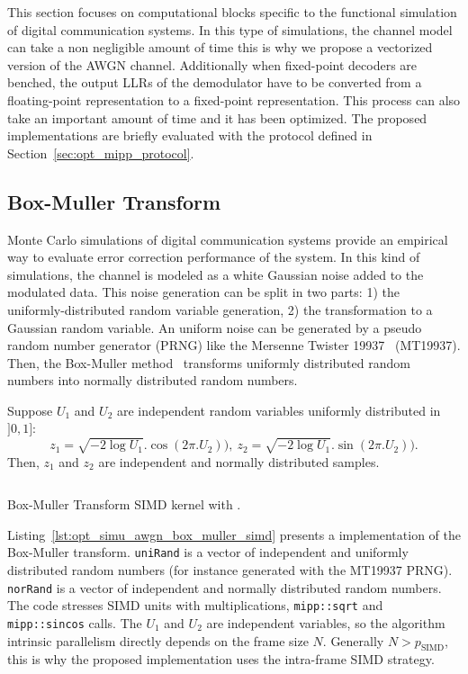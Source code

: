 This section focuses on computational blocks specific to the functional
simulation of digital communication systems. In this type of simulations,
the channel model can take a non negligible amount of time this is why we
propose a vectorized version of the AWGN channel. Additionally when fixed-point
decoders are benched, the output LLRs of the demodulator have to be converted
from a floating-point representation to a fixed-point representation. This
process can also take an important amount of time and it has been optimized.
The proposed implementations are briefly evaluated with the protocol defined in
Section~\ref{sec:opt_mipp_protocol}.

\subsection{Box-Muller Transform}
\label{sec:opt_simu_awgn}

Monte Carlo simulations of digital communication systems provide an empirical
way to evaluate error correction performance of the system. In this kind of
simulations, the channel is modeled as a white Gaussian noise added to the
modulated data. This noise generation can be split in two parts: 1) the
uniformly-distributed random variable generation, 2) the transformation to a
Gaussian random variable. An uniform noise can be generated by a pseudo random
number generator (PRNG) like the Mersenne Twister 19937~\cite{Matsumoto1998}
(MT19937). Then, the Box-Muller method~\cite{Box1958} transforms uniformly
distributed random numbers into normally distributed random numbers.

Suppose $U_1$ and $U_2$ are independent random variables uniformly distributed
in $]0, 1]$:
\begin{equation*}
  z_1 = \sqrt{-2 \log{U_1}}.\cos(2\pi.U_2)),~z_2 = \sqrt{-2 \log{U_1}}.\sin(2\pi.U_2)).
\end{equation*}
Then, $z_1$ and $z_2$ are independent and normally distributed samples.

\begin{listing}[htp]
  \inputminted[frame=lines,linenos]{C++}{\curChapter/src/simu/awgn/box_muller_simd.cpp}
  \caption{Box-Muller Transform SIMD kernel with \MIPP.}
  \label{lst:opt_simu_awgn_box_muller_simd}
\end{listing}

Listing~\ref{lst:opt_simu_awgn_box_muller_simd} presents a \MIPP implementation
of the Box-Muller transform. \verb|uniRand| is a vector of independent and
uniformly distributed random numbers (for instance generated with the MT19937
PRNG). \verb|norRand| is a vector of independent and normally distributed random
numbers. The code stresses SIMD units with multiplications, \verb|mipp::sqrt|
and \verb|mipp::sincos| calls. The $U_1$ and $U_2$ are independent variables, so
the algorithm intrinsic parallelism directly depends on the frame size $N$.
Generally $N > p_\text{SIMD}$, this is why the proposed implementation uses the
intra-frame SIMD strategy.

